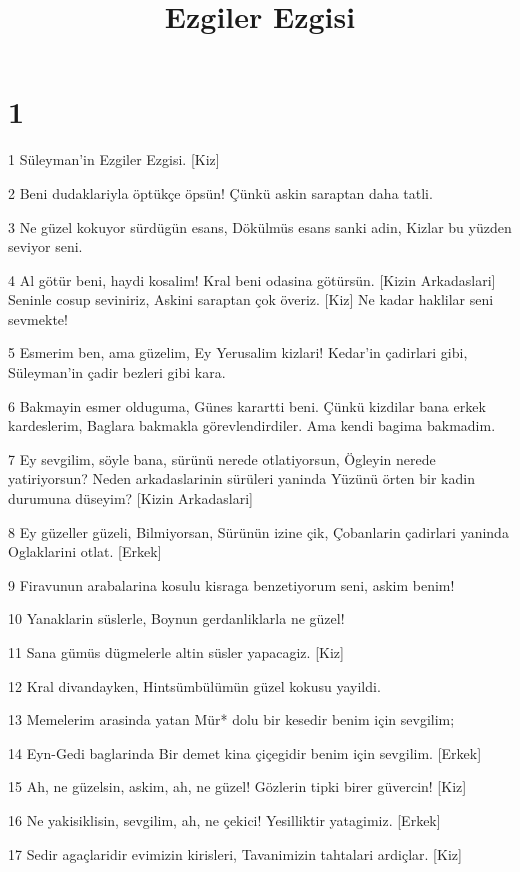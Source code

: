 

\title{Ezgiler Ezgisi}


\chapter{1}

\par 1 Süleyman'in Ezgiler Ezgisi. [Kiz]
\par 2 Beni dudaklariyla öptükçe öpsün! Çünkü askin saraptan daha tatli.
\par 3 Ne güzel kokuyor sürdügün esans, Dökülmüs esans sanki adin, Kizlar bu yüzden seviyor seni.
\par 4 Al götür beni, haydi kosalim! Kral beni odasina götürsün. [Kizin Arkadaslari] Seninle cosup seviniriz, Askini saraptan çok överiz. [Kiz] Ne kadar haklilar seni sevmekte!
\par 5 Esmerim ben, ama güzelim, Ey Yerusalim kizlari! Kedar'in çadirlari gibi, Süleyman'in çadir bezleri gibi kara.
\par 6 Bakmayin esmer olduguma, Günes karartti beni. Çünkü kizdilar bana erkek kardeslerim, Baglara bakmakla görevlendirdiler. Ama kendi bagima bakmadim.
\par 7 Ey sevgilim, söyle bana, sürünü nerede otlatiyorsun, Ögleyin nerede yatiriyorsun? Neden arkadaslarinin sürüleri yaninda Yüzünü örten bir kadin durumuna düseyim? [Kizin Arkadaslari]
\par 8 Ey güzeller güzeli, Bilmiyorsan, Sürünün izine çik, Çobanlarin çadirlari yaninda Oglaklarini otlat. [Erkek]
\par 9 Firavunun arabalarina kosulu kisraga benzetiyorum seni, askim benim!
\par 10 Yanaklarin süslerle, Boynun gerdanliklarla ne güzel!
\par 11 Sana gümüs dügmelerle altin süsler yapacagiz. [Kiz]
\par 12 Kral divandayken, Hintsümbülümün güzel kokusu yayildi.
\par 13 Memelerim arasinda yatan Mür* dolu bir kesedir benim için sevgilim;
\par 14 Eyn-Gedi baglarinda Bir demet kina çiçegidir benim için sevgilim. [Erkek]
\par 15 Ah, ne güzelsin, askim, ah, ne güzel! Gözlerin tipki birer güvercin! [Kiz]
\par 16 Ne yakisiklisin, sevgilim, ah, ne çekici! Yesilliktir yatagimiz. [Erkek]
\par 17 Sedir agaçlaridir evimizin kirisleri, Tavanimizin tahtalari ardiçlar. [Kiz]


